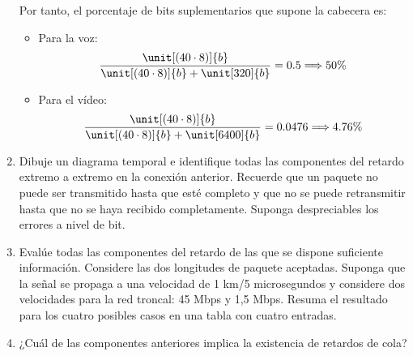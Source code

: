 \begin{ejercicio}
\begin{enumerate}
        Por tanto, el porcentaje de bits suplementarios que supone la cabecera es:
        \begin{itemize}
            \item Para la voz:
            \begin{equation*}
                \frac{\unit[(40\cdot 8)]{b}}{\unit[(40\cdot 8)]{b}+\unit[320]{b}} = 0.5\Longrightarrow 50\%
            \end{equation*}
            \item Para el vídeo:
            \begin{equation*}
                \frac{\unit[(40\cdot 8)]{b}}{\unit[(40\cdot 8)]{b}+\unit[6400]{b}} = 0.0476\Longrightarrow 4.76\%
            \end{equation*}
        \end{itemize}
        \item Dibuje un diagrama temporal e identifique todas las componentes del retardo extremo a extremo en la conexión anterior. Recuerde que un paquete no puede ser transmitido hasta que esté completo y que no se puede retransmitir hasta que no se haya recibido completamente. Suponga despreciables los errores a nivel de bit.
        \item Evalúe todas las componentes del retardo de las que se dispone suficiente información. Considere las dos longitudes de paquete aceptadas. Suponga que la señal se propaga a una velocidad de 1 km/5 microsegundos y considere dos velocidades para la red troncal: 45 Mbps y 1,5 Mbps. Resuma el resultado para los cuatro posibles casos en una tabla con cuatro entradas.
        \item ¿Cuál de las componentes anteriores implica la existencia de retardos de cola?
    \end{enumerate}

\end{ejercicio}


